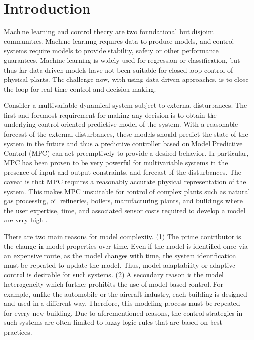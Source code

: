 \section{Introduction}


Machine learning and control theory are two foundational but disjoint communities. Machine learning requires data to produce models, and control systems require models to provide stability, safety or other performance guarantees. Machine learning is widely used for regression or classification, but thus far data-driven models have not been suitable for closed-loop control of physical plants. The challenge now, with using data-driven approaches, is to close the loop for real-time control and decision making.

Consider a multivariable dynamical system subject to external disturbances. The first and foremost requirement for making any decision is to obtain the underlying control-oriented predictive model of the system. With a reasonable forecast of the external disturbances, these models should predict the state of the system in the future and thus a predictive controller based on Model Predictive Control (MPC) can act preemptively to provide a desired behavior. In particular, MPC has been proven to be very powerful for multivariable systems in the presence of input and output constraints, and forecast of the disturbances. The caveat is that MPC requires a reasonably accurate physical representation of the system. This makes MPC unsuitable for control of complex plants such as natural gas processing, oil refineries, boilers, manufacturing plants, and buildings where the user expertise, time, and associated sensor costs required to develop a model are very high \cite{Sturzenegger2016,vzavcekova2014}.

There are two main reasons for model complexity. 
(1) The prime contributor is the change in model properties over time. Even if the model is identified once via an expensive route, as the model changes with time, the system identification must be repeated to update the model. Thus, model adaptability or adaptive control is desirable for such systems. 
(2) A secondary reason is the model heterogeneity which further prohibits the use of model-based control. For example, unlike the automobile or the aircraft industry, each building is designed and used in a different way. Therefore, this modeling process must be repeated for every new building. 
Due to aforementioned reasons, the control strategies in such systems are often limited to fuzzy logic rules that are based on best practices. 

